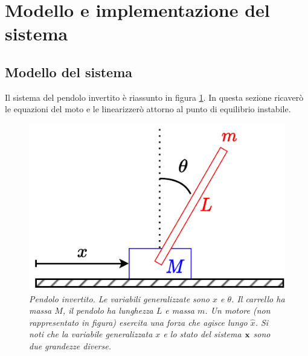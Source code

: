 \section{Modello e implementazione del sistema}\label{sec:modello}
\subsection{Modello del sistema}\label{subsec:modello-del-sistema}
Il sistema del pendolo invertito è riassunto in figura \ref{fig:sistema}.
In questa sezione ricaverò le equazioni del moto e le linearizzerò attorno al punto di equilibrio instabile.

\begin{figure}[h]
    \includegraphics{../assets/sistema.pdf}
  \caption{\emph{Pendolo invertito. Le variabili generalizzate sono $x$ e $\theta$. Il carrello ha massa $M$,
  il pendolo ha lunghezza $L$ e massa $m$. Un motore (non rappresentato in figura) esercita una forza che agisce
  lungo $\hat x$. Si noti che la variabile generalizzata $x$ e lo stato del sistema $\bf x$ sono due grandezze diverse.}}
  \label{fig:sistema}
\end{figure}


